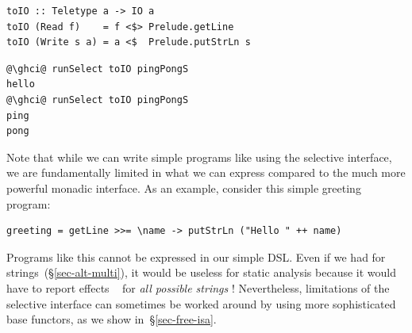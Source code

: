 \vspace{1mm}
\begin{verbatim}
toIO :: Teletype a -> IO a
toIO (Read f)    = f <$> Prelude.getLine
toIO (Write s a) = a <$  Prelude.putStrLn s
\end{verbatim}
\vspace{0mm}
\begin{verbatim}
@\ghci@ runSelect toIO pingPongS
hello
@\ghci@ runSelect toIO pingPongS
ping
pong
\end{verbatim}
\vspace{1mm}

\noindent
Note that while we can write simple programs like  using the
selective interface, we are fundamentally limited in what we can express
compared to the much more powerful monadic interface. As an example, consider
this simple greeting program:

\vspace{1mm}
\begin{verbatim}
greeting = getLine >>= \name -> putStrLn ("Hello " ++ name)
\end{verbatim}
\vspace{1mm}

\noindent
Programs like this cannot be expressed in our simple  DSL. Even if
we had  for strings~(\S\ref{sec-alt-multi}), it would be useless for
static analysis because it would have to report effects ~ for
\emph{all possible strings} ! Nevertheless, limitations of the
selective interface can sometimes be worked around by using more sophisticated
base functors, as we show in~\S\ref{sec-free-isa}.


